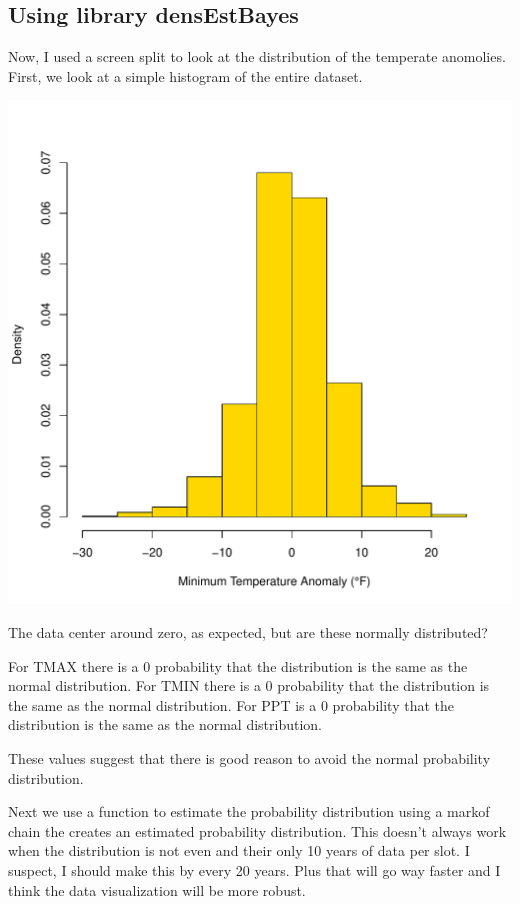 \documentclass{article}\usepackage[]{graphicx}\usepackage[]{color}
\makeatletter
\def\maxwidth{ %
  \ifdim\Gin@nat@width>\linewidth
    \linewidth
  \else
    \Gin@nat@width
  \fi
}
\newenvironment{knitrout}{}{} %
\makeatother
\begin{document}
\subsection{Using library densEstBayes}

Now, I used a screen split to look at the distribution of the temperate anomolies. First, we look at a simple histogram of the entire dataset. 

\begin{knitrout}
\color{fgcolor}
\includegraphics[width=\maxwidth]{figure/unnamed-chunk-16-1} 
\end{knitrout}

The data center around zero, as expected, but are these normally distributed? 

For TMAX there is a 0 probability that the distribution is the same as the normal distribution. For TMIN there is a 0 probability that the distribution is the same as the normal distribution. For PPT is a 0 probability that the distribution is the same as the normal distribution.



These values suggest that there is good reason to avoid  the normal probability distribution. 

Next we use a function to estimate the probability distribution using a markof chain the creates an estimated probability distribution. This doesn't always work when the distribution is not even and their only 10 years of data per slot. I suspect, I should make this by every 20 years. Plus that will go way faster and I think the data visualization will be more robust. 
\end{document}
